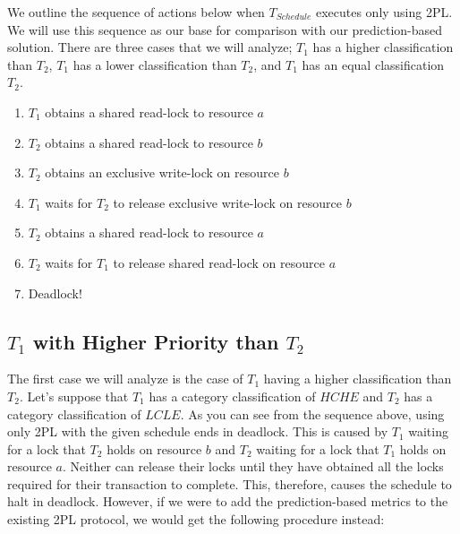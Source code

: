 We outline the sequence of actions below when $T_{Schedule}$ executes only using \ac{2PL}. We will use this sequence as our base for comparison with our prediction-based solution. There are three cases that we will analyze; $T_{1}$ has a higher classification than $T_{2}$, $T_{1}$ has a lower classification than $T_{2}$, and $T_{1}$ has an equal classification $T_{2}$.

\begin{enumerate}
  \item $T_{1}$ obtains a shared read-lock to resource $a$
  \item $T_{2}$ obtains a shared read-lock to resource $b$
  \item $T_{2}$ obtains an exclusive write-lock on resource $b$
  \item $T_{1}$ waits for $T_{2}$ to release exclusive write-lock on resource $b$
  \item $T_{2}$ obtains a shared read-lock to resource $a$
  \item $T_{2}$ waits for $T_{1}$ to release shared read-lock on resource $a$
  \item Deadlock!
\end{enumerate}

\subsection{\texorpdfstring{$T_{1}$ with Higher Priority than $T_{2}$}{}}
\label{sec:t1_higher_than_t2}
The first case we will analyze is the case of $T_{1}$ having a higher classification than $T_{2}$. Let's suppose that $T_{1}$ has a category classification of $HCHE$ and $T_{2}$ has a category classification of $LCLE$. As you can see from the sequence above, using only \ac{2PL} with the given schedule ends in deadlock. This is caused by $T_{1}$ waiting for a lock that $T_{2}$ holds on resource $b$ and $T_{2}$ waiting for a lock that $T_{1}$ holds on resource $a$. Neither can release their locks until they have obtained all the locks required for their transaction to complete. This, therefore, causes the schedule to halt in deadlock. However, if we were to add the prediction-based metrics to the existing \ac{2PL} protocol, we would get the following procedure instead:

